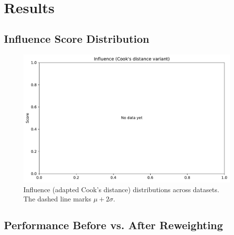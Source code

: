 \documentclass[sn-basic]{sn-jnl} %
\begin{document}
\section{Results}
\subsection{Influence Score Distribution}
\begin{figure}[H]
  \centering
  \includegraphics[width=.9\linewidth]{fig_influence_boxplots.pdf}%
  \caption{Influence (adapted Cook’s distance) distributions across datasets. The dashed line marks $\mu+2\sigma$.}
  \label{fig:influence}
\end{figure}

\subsection{Performance Before vs. After Reweighting}

\end{document}
